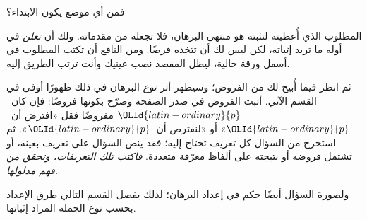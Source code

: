 \documentclass[../../../include/open-logic-section]{subfiles}
\begin{document}


فمن أي موضع يكون الابتداء؟

المطلوب الذي أُعطيته لتثبته هو منتهى البرهان، فلا تجعله من مقدماته.
ولك أن \emph{تعلن} في أوله ما تريد إثباته، لكن ليس لك أن تتخذه
فرضًا. ومن النافع أن تكتب المطلوب في أسفل ورقة خالية، ليظل المقصد
نصب عينيك وأنت ترتب الطريق إليه.

ثم انظر فيما أُبيح لك من الفروض؛ وسيظهر أثر \emph{نوع} البرهان في
ذلك ظهورًا أوفى في القسم الآتي. أثبت الفروض في صدر الصفحة وصرّح
بكونها فروضًا: فإن كان~$\OLId{latin-ordinary}{p}$ مفروضًا فقل «افترض أن~$\OLId{latin-ordinary}{p}$» أو «لنفترض
أن~$\OLId{latin-ordinary}{p}$». ثم استخرج من السؤال كل تعريف تحتاج إليه؛ فقد ينص السؤال على
تعريف بعينه، أو تشتمل فروضه أو نتيجته على ألفاظ معرّفة متعددة.
\emph{فاكتب تلك التعريفات، وتحقق من فهم مدلولها.}

ولصورة السؤال أيضًا حكم في إعداد البرهان؛ لذلك يفصل القسم التالي طرق
الإعداد بحسب نوع الجملة المراد إثباتها.
\end{document}
